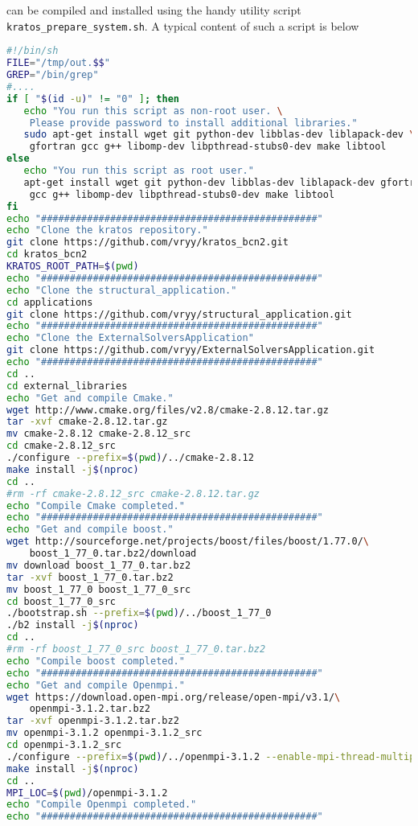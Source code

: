 \documentclass[12pt,a4paper,twoside]{article}
\begin{document}
\kratos can be compiled and installed using the handy utility script \texttt{kratos\_prepare\_system.sh}. A typical content of such a script is below
%
\begin{lstlisting}[language=bash, basicstyle=\footnotesize, frame=single]
#!/bin/sh
FILE="/tmp/out.$$"
GREP="/bin/grep"
#....
if [ "$(id -u)" != "0" ]; then
   echo "You run this script as non-root user. \
   	Please provide password to install additional libraries."
   sudo apt-get install wget git python-dev libblas-dev liblapack-dev \
   	gfortran gcc g++ libomp-dev libpthread-stubs0-dev make libtool
else
   echo "You run this script as root user."
   apt-get install wget git python-dev libblas-dev liblapack-dev gfortran \
   	gcc g++ libomp-dev libpthread-stubs0-dev make libtool
fi
echo "################################################"
echo "Clone the kratos repository."
git clone https://github.com/vryy/kratos_bcn2.git
cd kratos_bcn2
KRATOS_ROOT_PATH=$(pwd)
echo "################################################"
echo "Clone the structural_application."
cd applications
git clone https://github.com/vryy/structural_application.git
echo "################################################"
echo "Clone the ExternalSolversApplication"
git clone https://github.com/vryy/ExternalSolversApplication.git
echo "################################################"
cd ..
cd external_libraries
echo "Get and compile Cmake."
wget http://www.cmake.org/files/v2.8/cmake-2.8.12.tar.gz
tar -xvf cmake-2.8.12.tar.gz
mv cmake-2.8.12 cmake-2.8.12_src
cd cmake-2.8.12_src
./configure --prefix=$(pwd)/../cmake-2.8.12
make install -j$(nproc)
cd ..
#rm -rf cmake-2.8.12_src cmake-2.8.12.tar.gz
echo "Compile Cmake completed."
echo "################################################"
echo "Get and compile boost."
wget http://sourceforge.net/projects/boost/files/boost/1.77.0/\
	boost_1_77_0.tar.bz2/download
mv download boost_1_77_0.tar.bz2
tar -xvf boost_1_77_0.tar.bz2
mv boost_1_77_0 boost_1_77_0_src
cd boost_1_77_0_src
./bootstrap.sh --prefix=$(pwd)/../boost_1_77_0
./b2 install -j$(nproc)
cd ..
#rm -rf boost_1_77_0_src boost_1_77_0.tar.bz2
echo "Compile boost completed."
echo "################################################"
echo "Get and compile Openmpi."
wget https://download.open-mpi.org/release/open-mpi/v3.1/\
	openmpi-3.1.2.tar.bz2
tar -xvf openmpi-3.1.2.tar.bz2
mv openmpi-3.1.2 openmpi-3.1.2_src
cd openmpi-3.1.2_src
./configure --prefix=$(pwd)/../openmpi-3.1.2 --enable-mpi-thread-multiple
make install -j$(nproc)
cd ..
MPI_LOC=$(pwd)/openmpi-3.1.2
echo "Compile Openmpi completed."
echo "################################################"

\end{lstlisting}
\end{document}
